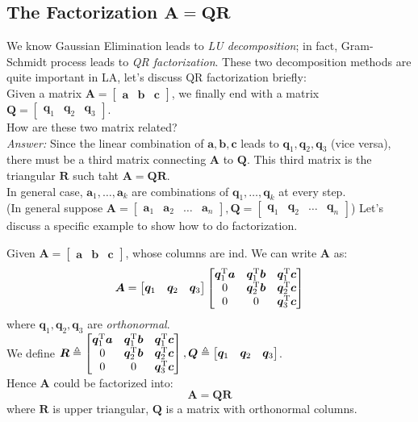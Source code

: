 \subsection[The Factorization $A=QR$.]{The Factorization $\bm A=\bm{QR}$}
We know Gaussian Elimination leads to \textit{LU decomposition}; in fact, Gram-Schmidt process leads to \textit{QR factorization}. These two decomposition methods are quite important in LA, let's discuss QR factorization briefly:\\
Given a matrix $\bm A=\begin{bmatrix}
\bm a&\bm b&\bm c
\end{bmatrix}$, we finally end with a matrix $\bm Q=\begin{bmatrix}
\bm q_1&\bm q_2&\bm q_3
\end{bmatrix}$.\\ How are these two matrix related? \\
\textit{Answer:} Since the linear combination of $\bm a,\bm b,\bm c$ leads to $\bm q_1,\bm q_2,\bm q_3$ (vice versa), there must be a third matrix connecting $\bm A$ to $\bm Q$. This third matrix is the triangular $\bm R$ such taht $\bm A=\bm{QR}$.\\
In general case, $\bm a_1,\dots,\bm a_k$ are combinations of $\bm q_1,\dots,\bm q_k$ at every step.\\ (In general suppose $\bm A=\begin{bmatrix}
\bm a_1&\bm a_2&\dots&\bm a_n
\end{bmatrix}, \bm Q=\begin{bmatrix}
\bm q_1&\bm q_2&\dots&\bm q_n
\end{bmatrix}$)
\newpage
Let's discuss a specific example to show how to do factorization.
\begin{example}
Given $\bm A=\begin{bmatrix}
\bm a&\bm b&\bm c
\end{bmatrix}$, whose columns are ind. We can write $\bm A$ as:
\[
\bm A=\begin{bmatrix}
\bm q_1&\bm q_2&\bm q_3
\end{bmatrix}\begin{bmatrix}
\bm q_1^{\mathrm T}\bm a&\bm q_1^{\mathrm T}\bm b&\bm q_1^{\mathrm T}\bm c\\0&\bm q_2^{\mathrm T}\bm b&\bm q_2^{\mathrm T}\bm c\\0&0&\bm q_3^{\mathrm T}\bm c
\end{bmatrix}
\]
where $\bm q_1,\bm q_2,\bm q_3$ are \emph{orthonormal}.\\
We define $\bm R\triangleq\begin{bmatrix}
\bm q_1^{\mathrm T}\bm a&\bm q_1^{\mathrm T}\bm b&\bm q_1^{\mathrm T}\bm c\\0&\bm q_2^{\mathrm T}\bm b&\bm q_2^{\mathrm T}\bm c\\0&0&\bm q_3^{\mathrm T}\bm c
\end{bmatrix}, \bm Q\triangleq\begin{bmatrix}
\bm q_1&\bm q_2&\bm q_3
\end{bmatrix}$.\\
Hence $\bm A$ could be factorized into:
\[
\bm A=\bm{QR}
\]
where $\bm R$ is upper triangular, $\bm Q$ is a matrix with orthonormal columns.
\end{example}
